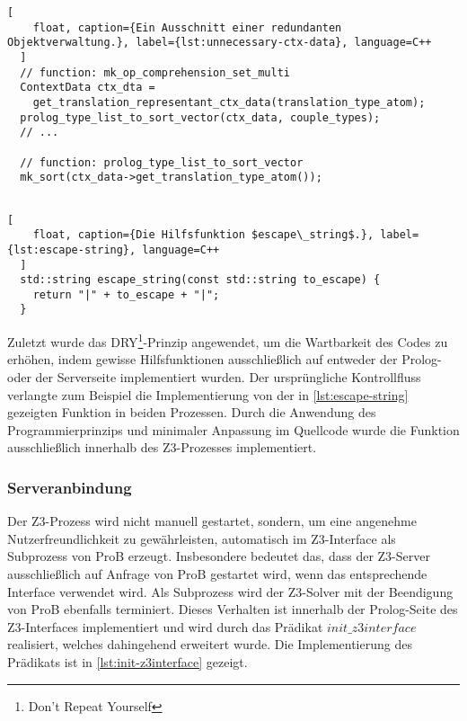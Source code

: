 \begin{lstlisting}[
    float, caption={Ein Ausschnitt einer redundanten Objektverwaltung.}, label={lst:unnecessary-ctx-data}, language=C++
  ]
  // function: mk_op_comprehension_set_multi
  ContextData ctx_dta =
    get_translation_representant_ctx_data(translation_type_atom);
  prolog_type_list_to_sort_vector(ctx_data, couple_types);
  // ...
  
  // function: prolog_type_list_to_sort_vector
  mk_sort(ctx_data->get_translation_type_atom());
  
\end{lstlisting}

\begin{lstlisting}[
    float, caption={Die Hilfsfunktion $escape\_string$.}, label={lst:escape-string}, language=C++
  ]
  std::string escape_string(const std::string to_escape) {
    return "|" + to_escape + "|";
  }
\end{lstlisting}

Zuletzt wurde das DRY\footnote{Don't Repeat Yourself}-Prinzip angewendet, um die Wartbarkeit des Codes zu erhöhen,
indem gewisse Hilfsfunktionen ausschließlich auf entweder der Prolog- oder der Serverseite implementiert wurden.
Der ursprüngliche Kontrollfluss verlangte zum Beispiel die Implementierung von der in \cref{lst:escape-string} gezeigten Funktion
in beiden Prozessen. Durch die Anwendung des Programmierprinzips und minimaler Anpassung im Quellcode wurde die Funktion ausschließlich innerhalb des Z3-Prozesses implementiert.

\subsubsection{Serveranbindung}
\label{subsec:server-connection}

Der Z3-Prozess wird nicht manuell gestartet, sondern,
um eine angenehme Nutzerfreundlichkeit zu gewährleisten, automatisch im Z3-Interface als Subprozess von ProB erzeugt.
Insbesondere bedeutet das, dass der Z3-Server ausschließlich auf Anfrage von ProB gestartet wird, wenn das entsprechende Interface verwendet wird.
Als Subprozess wird der Z3-Solver mit der Beendigung von ProB ebenfalls terminiert.
Dieses Verhalten ist innerhalb der Prolog-Seite des Z3-Interfaces implementiert und wird durch das Prädikat $init\_z3interface$ realisiert, welches dahingehend erweitert wurde.
Die Implementierung des Prädikats ist in \cref{lst:init-z3interface} gezeigt.

